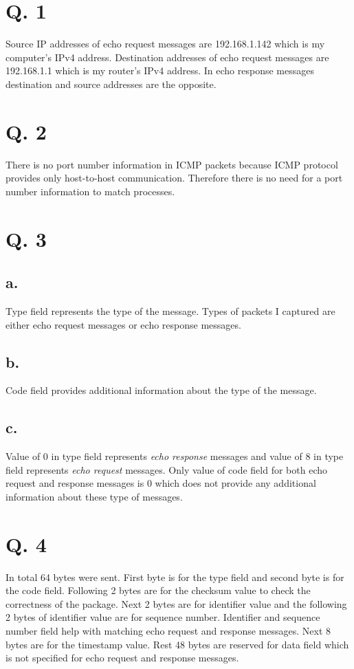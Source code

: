 \documentclass[11pt]{article}
\begin{document}
	\break

	\section*{Q. 1}
	Source IP addresses of echo request messages are 192.168.1.142 which is my computer's IPv4 address. 
	Destination addresses of echo request messages are 192.168.1.1 which is my router's IPv4 address. 
	In echo response messages destination and source addresses are the opposite.

	\section*{Q. 2}
	There is no port number information in ICMP packets because ICMP protocol provides only host-to-host
	communication. Therefore there is no need for a port number information to match processes.
	
	\section*{Q. 3}
	\subsection*{a.} 
	Type field represents the type of the message. 
	Types of packets I captured are either echo request messages or echo response messages.
	
	\subsection*{b.}
	Code field provides additional information about the type of the message.

	\subsection*{c.}
	Value of 0 in type field represents \emph{echo response} messages and value of 8 in type field
	represents \emph{echo request} messages. Only value of code field for both echo request and response messages is 0 which does not
	provide any additional information about these type of messages.

	\section*{Q. 4}
	In total 64 bytes were sent. First byte is for the type field and second byte is for the code field.
	Following 2 bytes are for the checksum value to check the correctness of the package.
	Next 2 bytes are for identifier value and the following 2 bytes of identifier value are for sequence number.
	Identifier and sequence number field help with matching echo request and response messages.
	Next 8 bytes are for the timestamp value. Rest 48 bytes are reserved for data field which is not specified for echo request and response messages.
\end{document}

